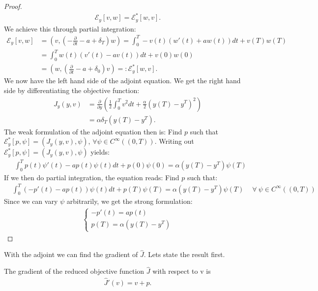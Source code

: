 \begin{proof}
\begin{align*}
\mathcal{E}_y[v,w]=\mathcal{E}_y^*[w,v].
\end{align*}
We achieve this through partial integration:
\begin{align*}
\mathcal{E}_y[v,w] &=(v,(-\frac{\partial}{\partial t} - a + \delta_T)w) = \int_0^T-v(t)(w'(t)+aw(t))dt + v(T)w(T) \\
&=\int_0^Tw(t)(v'(t)-a v(t))dt+v(0)w(0) \\
&= (w,(\frac{\partial}{\partial t} - a+\delta_0)v)
=:\mathcal{E}_y^*[w,v].
\end{align*}
We now have the left hand side of the adjoint equation. We get the right hand side by differentiating the objective function:
\begin{align*}
J_y(y,v) & = \frac{\partial}{\partial y} (\frac{1}{2}\int_0^Tv^2dt + \frac{\alpha}{2}(y(T)-y^T)^2) \\ 
&= \alpha\delta_T(y(T)-y^T).
\end{align*}
The weak formulation of the adjoint equation then is: Find $p$ such that $\mathcal{E}_y^*[p,\psi]=(J_y(y,v),\psi)$, $\forall\psi\in C^{\infty}((0,T))$. Writing out $\mathcal{E}_y^*[p,\psi]=(J_y(y,v),\psi)$ yields:
\begin{align*}
&\int_0^Tp(t)\psi'(t)-a p(t)\psi(t)dt + p(0)\psi(0)= \alpha(y(T)-y^T)\psi(T)
\end{align*}
If we then do partial integration, the equation reads: Find $p$ such that:
\begin{align*}
&\int_0^T(-p'(t)-ap(t))\psi(t)dt +p(T)\psi(T)= \alpha(y(T)-y^T)\psi(T)\ \quad\forall \ \psi \in C^{\infty}((0,T))
\end{align*}
Since we can vary $\psi$ arbitrarily, we get the strong formulation:
 \begin{align*}
   \left\{
     \begin{array}{lr}
       -p'(t) = ap(t) \\
       p(T) = \alpha( y(T)-y^T)
     \end{array}
   \right.
\end{align*}
\end{proof}
\noindent
With the adjoint we can find the gradient of $\hat{J}$. Lets state the result first.
\begin{proposition}
The gradient of the reduced objective function $\hat{J}$ with respect to v is
\begin{align}
\hat{J}'(v)=v+p. \label{exsample_grad}
\end{align} 
\end{proposition}
